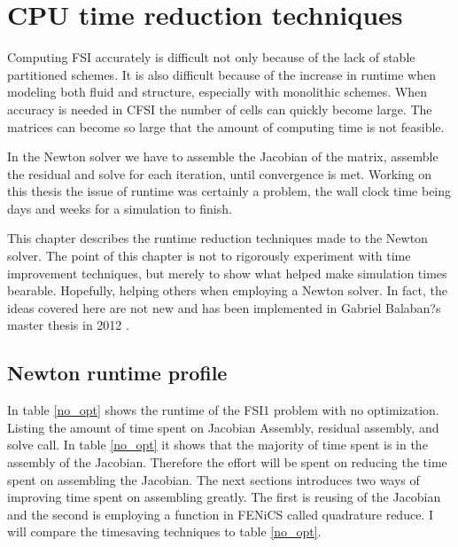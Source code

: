 \chapter{CPU time reduction techniques}\label{runtime}
Computing FSI accurately is difficult not only because of the lack of stable partitioned schemes. It is also difficult because of the increase in runtime when modeling both fluid and structure, especially with monolithic schemes. When accuracy is needed in CFSI the number of cells can quickly become large. The matrices can become so large that the amount of computing time is not feasible.

In the Newton solver we have to assemble the Jacobian of the matrix, assemble the residual and solve for each iteration, until convergence is met. Working on this thesis the issue of runtime was certainly a problem, the wall clock time being days and weeks for a simulation to finish. 

This chapter describes the runtime reduction techniques made to the Newton solver. The point of this chapter is not to rigorously experiment with time improvement techniques, but merely to show what helped make simulation times bearable. Hopefully, helping others when employing a Newton solver. In fact, the ideas covered here are not new and has been implemented in Gabriel Balaban?s master thesis in 2012 \cite{Sciences2012}.

\section{Newton runtime profile}
In table \ref{no_opt} shows the runtime of the  FSI1 problem with no optimization. Listing the amount of time spent on Jacobian Assembly, residual assembly, and solve call. 
In table \ref{no_opt} it shows that the majority of time spent is in the assembly of the Jacobian. Therefore the effort will be spent on reducing the time spent on assembling the Jacobian. The next sections introduces two ways of improving time spent on assembling greatly. The first is reusing of the Jacobian and the second is employing a function in FENiCS called quadrature reduce. I will compare the timesaving techniques to table \ref{no_opt}.

